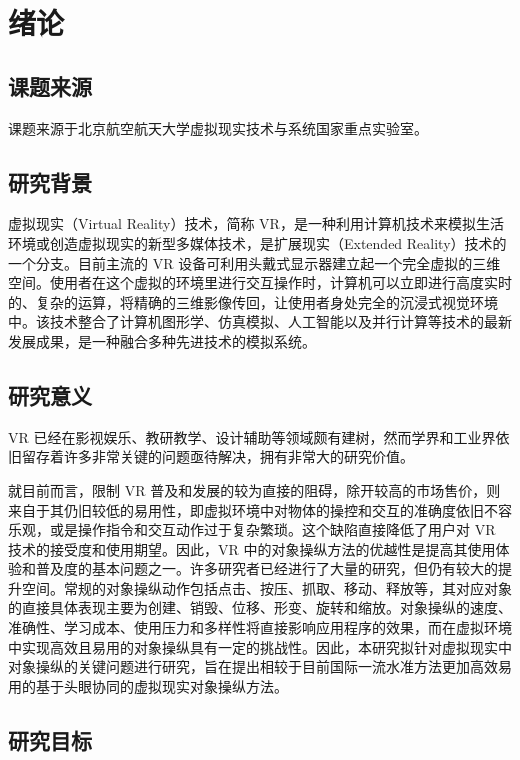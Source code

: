 \chapter{绪论}

\section{课题来源}

课题来源于北京航空航天大学虚拟现实技术与系统国家重点实验室。

\section{研究背景}

虚拟现实（Virtual Reality）技术，简称 VR，是一种利用计算机技术来模拟生活环境或创造虚拟现实的新型多媒体技术，是扩展现实（Extended Reality）技术的一个分支。目前主流的 VR 设备可利用头戴式显示器建立起一个完全虚拟的三维空间。使用者在这个虚拟的环境里进行交互操作时，计算机可以立即进行高度实时的、复杂的运算，将精确的三维影像传回，让使用者身处完全的沉浸式视觉环境中。该技术整合了计算机图形学、仿真模拟、人工智能以及并行计算等技术的最新发展成果，是一种融合多种先进技术的模拟系统。


\section{研究意义}

VR 已经在影视娱乐、教研教学、设计辅助等领域颇有建树，然而学界和工业界依旧留存着许多非常关键的问题亟待解决，拥有非常大的研究价值。

就目前而言，限制 VR 普及和发展的较为直接的阻碍，除开较高的市场售价，则来自于其仍旧较低的易用性，即虚拟环境中对物体的操控和交互的准确度依旧不容乐观，或是操作指令和交互动作过于复杂繁琐。这个缺陷直接降低了用户对 VR 技术的接受度和使用期望。因此，VR 中的对象操纵方法的优越性是提高其使用体验和普及度的基本问题之一。许多研究者已经进行了大量的研究，但仍有较大的提升空间。常规的对象操纵动作包括点击、按压、抓取、移动、释放等，其对应对象的直接具体表现主要为创建、销毁、位移、形变、旋转和缩放。对象操纵的速度、准确性、学习成本、使用压力和多样性将直接影响应用程序的效果，而在虚拟环境中实现高效且易用的对象操纵具有一定的挑战性。因此，本研究拟针对虚拟现实中对象操纵的关键问题进行研究，旨在提出相较于目前国际一流水准方法更加高效易用的基于头眼协同的虚拟现实对象操纵方法。

\section{研究目标}

